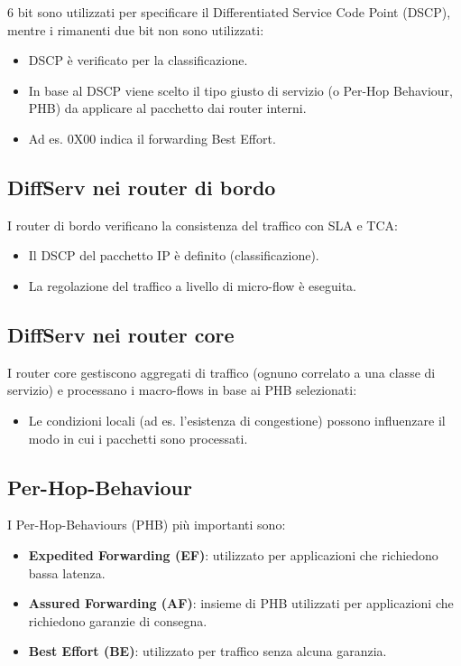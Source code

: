 6 bit sono utilizzati per specificare il Differentiated Service Code Point (DSCP), mentre i rimanenti due bit non sono utilizzati:
\begin{itemize}
	\item DSCP è verificato per la classificazione.
	\item In base al DSCP viene scelto il tipo giusto di servizio (o Per-Hop Behaviour, PHB) da applicare al pacchetto dai router interni.
	\item Ad es. 0X00 indica il forwarding Best Effort.
\end{itemize}

\subsection{DiffServ nei router di bordo}
I router di bordo verificano la consistenza del traffico con SLA e TCA:
\begin{itemize}
	\item Il DSCP del pacchetto IP è definito (classificazione).
	\item La regolazione del traffico a livello di micro-flow è eseguita.
\end{itemize}

\subsection{DiffServ nei router core}
I router core gestiscono aggregati di traffico (ognuno correlato a una classe di servizio) e processano i macro-flows in base ai PHB selezionati:
\begin{itemize}
	\item Le condizioni locali (ad es. l'esistenza di congestione) possono influenzare il modo in cui i pacchetti sono processati.
\end{itemize}

\subsection{Per-Hop-Behaviour}
I Per-Hop-Behaviours (PHB) più importanti sono:
\begin{itemize}
	\item \textbf{Expedited Forwarding (EF)}: utilizzato per applicazioni che richiedono bassa latenza.
	\item \textbf{Assured Forwarding (AF)}: insieme di PHB utilizzati per applicazioni che richiedono garanzie di consegna.
	\item \textbf{Best Effort (BE)}: utilizzato per traffico senza alcuna garanzia.
\end{itemize}

